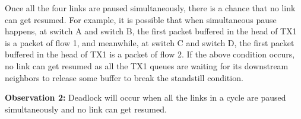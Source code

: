 Once all the four links are paused simultaneously, there is a chance that no link can get resumed. For example, it is possible that when simultaneous pause happens, at switch A and switch B, the first packet buffered in the head of TX1 is a packet of flow 1, and meanwhile, at switch C and switch D, the first packet buffered in the head of TX1 is a packet of flow 2. If the above condition occurs, no link can get resumed as all the TX1 queues are waiting for its downstream neighbors to release some buffer to break the standstill condition.

\textbf{Observation 2:} Deadlock will occur when all the links in a cycle are paused simultaneously and no link can get resumed.


\begin{figure}[t]
\centering



\end{figure}
